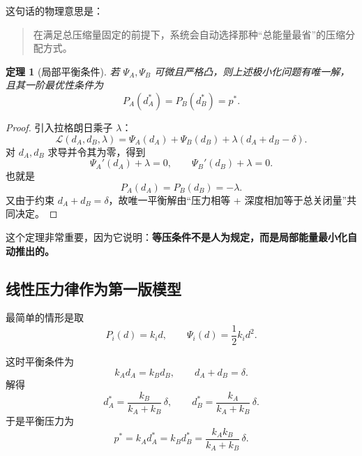 \documentclass[12pt,a4paper]{ctexart}
\newtheorem{theorem}{定理}
\begin{document}
这句话的物理意思是：
\begin{quote}
在满足总压缩量固定的前提下，系统会自动选择那种“总能量最省”的压缩分配方式。
\end{quote}

\begin{theorem}[局部平衡条件]
若 $\Psi_A,\Psi_B$ 可微且严格凸，则上述极小化问题有唯一解，且其一阶最优性条件为
\begin{equation}
    P_A(d_A^*) = P_B(d_B^*) = p^*.
\end{equation}
\end{theorem}

\begin{proof}
引入拉格朗日乘子 $\lambda$：
\begin{equation}
    \mathcal L(d_A,d_B,\lambda)=\Psi_A(d_A)+\Psi_B(d_B)+\lambda(d_A+d_B-\delta).
\end{equation}
对 $d_A,d_B$ 求导并令其为零，得到
\begin{equation}
    \Psi_A'(d_A)+\lambda=0,
    \qquad
    \Psi_B'(d_B)+\lambda=0.
\end{equation}
也就是
\begin{equation}
    P_A(d_A)=P_B(d_B)=-\lambda.
\end{equation}
又由于约束 $d_A+d_B=\delta$，故唯一平衡解由“压力相等 + 深度相加等于总关闭量”共同决定。
\end{proof}

这个定理非常重要，因为它说明：\textbf{等压条件不是人为规定，而是局部能量最小化自动推出的。}

\subsection{线性压力律作为第一版模型}
最简单的情形是取
\begin{equation}
    P_i(d)=k_i d,
    \qquad
    \Psi_i(d)=\frac12 k_i d^2.
\end{equation}

这时平衡条件为
\begin{equation}
    k_A d_A = k_B d_B,
    \qquad
    d_A+d_B=\delta.
\end{equation}
解得
\begin{equation}
    d_A^*=\frac{k_B}{k_A+k_B}\,\delta,
    \qquad
    d_B^*=\frac{k_A}{k_A+k_B}\,\delta.
\end{equation}
于是平衡压力为
\begin{equation}
    p^*=k_A d_A^*=k_B d_B^*=\frac{k_Ak_B}{k_A+k_B}\,\delta.
\end{equation}
\end{document}
